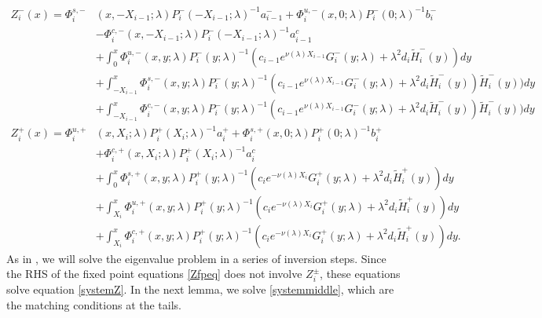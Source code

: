 \documentclass[12pt]{elsarticle}
\theoremstyle{plain}
\theoremstyle{definition}
\theoremstyle{remark}
\numberwithin{theorem}{section}
\numberwithin{equation}{section}
\begin{document}
\begin{equation}\label{Zfpeq}
\begin{aligned}
Z_i^-(x) = \Phi_i^{s,-}&(x, -X_{i-1}; \lambda) P_i^-(-X_{i-1}; \lambda)^{-1} a_{i-1}^- + \Phi_i^{u,-}(x, 0; \lambda) P_i^-(0; \lambda)^{-1} b_i^- \\
&- \Phi_i^{c,-}(x, -X_{i-1}; \lambda) P_i^-(-X_{i-1}; \lambda)^{-1} a_{i-1}^c \\
&+ \int_0^x \Phi_i^{u,-}(x, y; \lambda)P_i^-(y; \lambda)^{-1}(c_{i-1} e^{\nu(\lambda)X_{i-1}} G_i^-(y; \lambda) + \lambda^2 d_i \tilde{H}_i^-(y)) dy \\
&+ \int_{-X_{i-1}}^x \Phi_i^{s,-}(x, y; \lambda) P_i^-(y; \lambda)^{-1} (c_{i-1} e^{\nu(\lambda)X_{i-1}} G_i^-(y; \lambda) + \lambda^2 d_i \tilde{H}_i^-(y)) \tilde{H}_i^-(y)) dy \\
&+ \int_{-X_{i-1}}^x \Phi_i^{c,-}(x, y; \lambda) P_i^-(y; \lambda)^{-1} (c_{i-1} e^{\nu(\lambda)X_{i-1}} G_i^-(y; \lambda) + \lambda^2 d_i \tilde{H}_i^-(y)) \tilde{H}_i^-(y)) dy  \\ 
Z_i^+(x) = \Phi_i^{u,+}&(x, X_i; \lambda) P_i^+(X_i; \lambda)^{-1} a_i^+ + \Phi_i^{s,+}(x, 0; \lambda) P_i^+(0; \lambda)^{-1} b_i^+ \\
&+ \Phi_i^{c,+}(x, X_i; \lambda) P_i^+(X_i; \lambda)^{-1} a_i^c \\
&+ \int_0^x \Phi_i^{s,+}(x, y; \lambda) P_i^+(y; \lambda)^{-1} (c_i e^{-\nu(\lambda)X_i} G_i^+(y; \lambda) + \lambda^2 d_i \tilde{H}_i^+(y)) dy \\
&+ \int_{X_i}^x \Phi_i^{u,+}(x, y; \lambda) P_i^+(y; \lambda)^{-1}( c_i e^{-\nu(\lambda)X_i} G_i^+(y; \lambda) + \lambda^2 d_i \tilde{H}_i^+(y)) dy \\
&+ \int_{X_i}^x \Phi_i^{c,+}(x, y; \lambda) P_i^+(y; \lambda)^{-1}( c_i e^{-\nu(\lambda)X_i} G_i^+(y; \lambda) + \lambda^2 d_i \tilde{H}_i^+(y)) dy.
\end{aligned}
\end{equation}
As in \cite{Sandstede1998}, we will solve the eigenvalue problem in a series of inversion steps. Since the RHS of the fixed point equations \cref{Zfpeq} does not involve $Z_i^\pm$, these equations solve equation \cref{systemZ}. In the next lemma, we solve \cref{systemmiddle}, which are the matching conditions at the tails.
\end{document}
